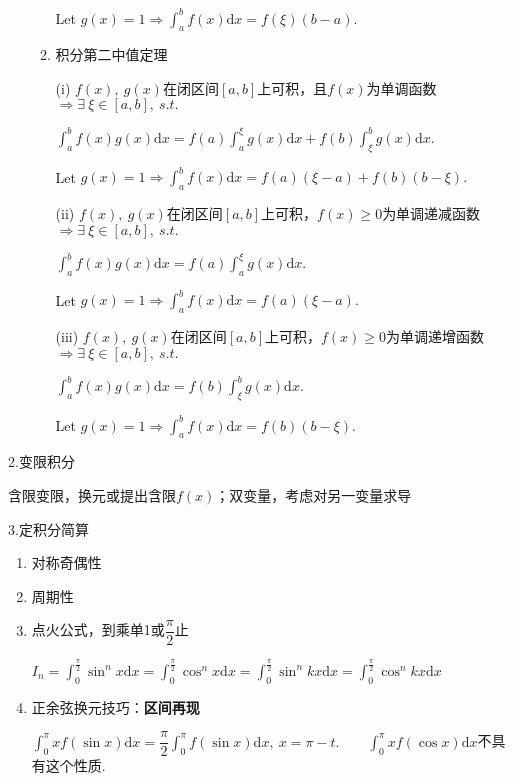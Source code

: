 \documentclass[UTF8]{ctexart}
\numberwithin{equation}{section}
\numberwithin{figure}{section}
\numberwithin{table}{section}
\newcommand\dif{\mathrm{d}}
\newcommand\no{\noindent}
\newcommand\dis{\displaystyle}
\newcommand\gs{\geqslant}
\newcommand\intd{\dis\int}
\newcommand\intab{\dis\int_a^b}
\begin{document}
\begin{spacing}{2}
\begin{enumerate}[itemindent=1.4em, label=(\arabic*)]
\begin{enumerate}[itemindent=1.4em, label=(\alph*)]
Let $g(x)=1\Longrightarrow \intab f(x)\dif x=f(\xi)(b-a).$

\item \textcolor[rgb]{1,0,0}{积分第二中值定理}

(i) $f(x),\ g(x)$在闭区间$[a,b]$上可积，且$f(x)$为单调函数
$\Longrightarrow\exists\ \xi\in[a,b],\ s.t.\ $

\centerline{$\intab f(x)g(x)\dif x=f(a)\intd_a^\xi g(x)\dif x+f(b)\intd_\xi^bg(x)\dif x.$}

Let $g(x)=1\Longrightarrow\intab f(x)\dif x=f(a)(\xi-a)+f(b)(b-\xi).$

(ii) $f(x),\ g(x)$在闭区间$[a,b]$上可积，$f(x)\gs0$为单调递减函数
$\Longrightarrow\exists\ \xi\in[a,b],\ s.t.\ $

\centerline{$\intab f(x)g(x)\dif x=f(a)\intd_a^\xi g(x)\dif x.$}

Let $g(x)=1\Longrightarrow\intab f(x)\dif x=f(a)(\xi-a).$

(iii) $f(x),\ g(x)$在闭区间$[a,b]$上可积，$f(x)\gs0$为单调递增函数
$\Longrightarrow\exists\ \xi\in[a,b],\ s.t.\ $

\centerline{$\intab f(x)g(x)\dif x=f(b)\intd_\xi^bg(x)\dif x.$}

Let $g(x)=1\Longrightarrow\intab f(x)\dif x=f(b)(b-\xi).$

\end{enumerate}

\end{enumerate}

\no2.变限积分

含限变限，换元或提出含限$f(x)$；双变量，考虑对另一变量求导

\no3.定积分简算

\begin{enumerate}[itemindent=1.4em, label=(\arabic*)]

\item 对称奇偶性

\item 周期性

\item \textcolor[rgb]{1,0,0}{点火公式}，到乘单1或$\dfrac{\pi}{2}$止

$I_n=\intd_0^{\tfrac{\pi}{2}}\sin^nx\dif x
=\intd_0^{\tfrac{\pi}{2}}\cos^nx\dif x
=\intd_0^{\tfrac{\pi}{2}}\sin^nkx\dif x
=\intd_0^{\tfrac{\pi}{2}}\cos^nkx\dif x$

\item 正余弦换元技巧：\textbf{区间再现}

$\intd_0^{\pi}xf(\sin x)\dif x=\dfrac{\pi}{2}\intd_0^\pi f(\sin x)\dif x,\ x=\pi-t.
\qquad\intd_0^{\pi}xf(\cos x)\dif x$不具有这个性质.


\end{enumerate}
\end{spacing}
\end{document}
